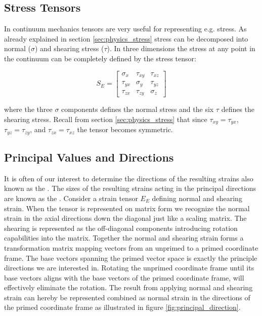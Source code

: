 \subsection{Stress Tensors}
In continuum mechanics tensors are very useful for representing
e.g. stress. As already explained in section \vref{sec:physics_stress}
stress can be decomposed into normal ($\sigma$) and 
shearing stress ($\tau$). In three dimensions the stress at any point
in the continuum can be completely defined by the stress tensor:

\begin{equation}
\label{eq:stress_tensor}
  S_E = 
  \left[{\begin{matrix} 
        \sigma_x & \tau_{xy} & \tau_{xz} \\ 
        \tau_{yx} & \sigma_y & \tau_{yz} \\ 
        \tau_{zx} & \tau_{zy} & \sigma_z 
      \end{matrix}}\right]
\end{equation}

where the three $\sigma$ components defines the normal stress and the
six $\tau$ defines the shearing stress. Recall from section
\vref{sec:physics_stress} that
since $\tau_{xy} = \tau_{yx}$, $\tau_{yz} = \tau_{zy}$, and $\tau_{zx} =
\tau_{xz}$ the tensor becomes symmetric.


\subsection{Principal Values and Directions}
\label{sec:principal_values_and_directions}
It is often of our interest to determine the directions of the resulting 
strains also known as the . The sizes of the resulting
strains acting in the principal directions are known as the
. 
Consider a
strain tensor $E_E$ defining normal and shearing strain. When the
tensor is represented on matrix form we recognize the normal strain
in the axial directions down the diagonal just like a scaling matrix. The shearing is
represented as the off-diagonal components introducing rotation
capabilities into the matrix. Together the normal and shearing strain
forms a transformation matrix mapping vectors from an unprimed to a
primed coordinate frame. The base vectors spanning the primed vector space is
exactly the principle directions we are interested in. Rotating the
unprimed coordinate frame until its base vectors aligns with the base vectors of the
primed coordinate frame, will effectively eliminate the rotation. 
The result from applying normal and shearing strain can hereby be
represented combined as normal strain in the directions of the primed
coordinate frame as illustrated in figure \vref{fig:principal_direction}.

